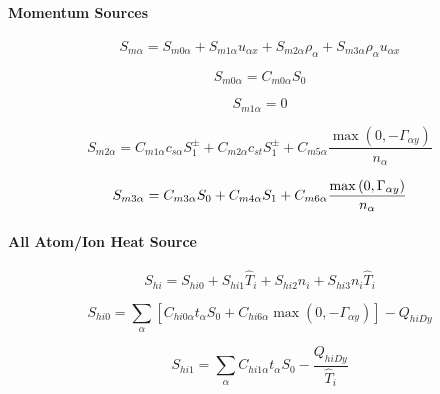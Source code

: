 \documentclass[11pt]{article}
\begin{document}
\bigskip

\paragraph{Momentum Sources}

\begin{equation}
S_{m\alpha}=S_{m0\alpha}+S_{m1\alpha}u_{\alpha x}+S_{m2\alpha}\rho_{\alpha
}+S_{m3\alpha}\rho_{\alpha}u_{\alpha x}   \label{47}
\end{equation}

\begin{equation}
S_{m0\alpha}=C_{m0\alpha}S_{0}   \label{48}
\end{equation}

\begin{equation}
S_{m1\alpha}=0   \label{49}
\end{equation}

\begin{equation}
S_{m2\alpha}=C_{m1\alpha}c_{s\alpha}S_{1}^{\pm}+C_{m2\alpha}c_{st}S_{1}^{\pm
}+C_{m5\alpha}\frac{\max\left( 0,-\Gamma_{\alpha y}\right) }{n_{\alpha}} 
\label{50}
\end{equation}

\begin{equation}
S_{m3\alpha}=C_{m3\alpha}S_{0}+C_{m4\alpha}S_{1}+C_{m6\alpha}\frac{%
\max\left( 0,\Gamma_{\alpha y}\right) }{n_{\alpha}}   \label{51}
\end{equation}

\bigskip

\paragraph{All Atom/Ion Heat Source}

\begin{equation}
S_{hi}=S_{hi0}+S_{hi1}\widehat{T}_{i}+S_{hi2}n_{i}+S_{hi3}n_{i}\widehat{T}%
_{i}   \label{52}
\end{equation}

\begin{equation}
S_{hi0}=\sum_{\alpha}\left[ C_{hi0\alpha}t_{\alpha}S_{0}+C_{hi6\alpha}\max%
\left( 0,-\Gamma_{\alpha y}\right) \right] -Q_{hiDy}   \label{53}
\end{equation}

\begin{equation}
S_{hi1}=\sum_{\alpha}C_{hi1\alpha}t_{\alpha}S_{0}-\frac{Q_{hiDy}}{\widehat
{T}_{i}}   \label{54}
\end{equation}
\end{document}

